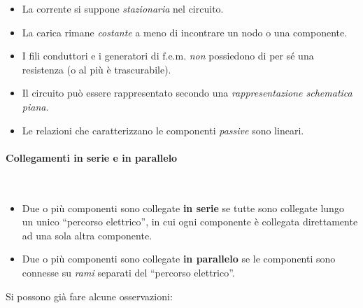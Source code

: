 \begin{itemize}
	\item La corrente si suppone \textit{stazionaria} nel circuito.
	\item La carica rimane \textit{costante} a meno di incontrare un nodo o una componente.
	\item I fili conduttori e i generatori di $\textrm{f.e.m.}$ \textit{non} possiedono di per sé una resistenza (o al più è trascurabile).
	\item Il circuito può essere rappresentato secondo una \textit{rappresentazione schematica piana}.
	\item Le relazioni che caratterizzano le componenti \textit{passive} sono lineari.
\end{itemize}
\paragraph{Collegamenti in serie e in parallelo}
\begin{defines}~
	\begin{itemize}
		\item Due o più componenti sono collegate \textbf{in serie} se tutte sono collegate lungo un unico ``percorso elettrico'', in cui ogni componente è collegata direttamente ad una sola altra componente.
		\item Due o più componenti sono collegate \textbf{in parallelo} se le componenti sono connesse su \textit{rami} separati del ``percorso elettrico''.
	\end{itemize}
\end{defines}
Si possono già fare alcune osservazioni:

